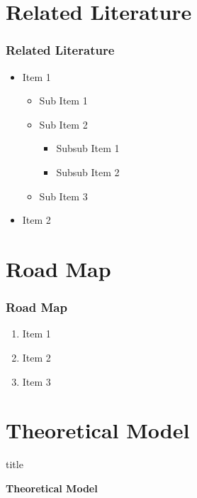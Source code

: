 \documentclass[11pt]{beamer}
\begin{document}
	\section[Literature]{Related Literature}
	\begin{frame}
		\frametitle{\bfseries Related Literature}
		
		\begin{itemize}
			\item Item 1
			
			\begin{itemize}
				\item Sub Item 1
				\item Sub Item 2
				
				\begin{itemize}
					\item Subsub Item 1
					\item Subsub Item 2
				\end{itemize}
				\item Sub Item 3
			\end{itemize}
			\item Item 2
			
		\end{itemize}
		
	\end{frame}
	
	\section{Road Map}
	\begin{frame}
		
		\frametitle{\bfseries Road Map}
		
		\begin{enumerate}
			\item Item 1
			\item Item 2
			\item Item 3
		\end{enumerate}
	\end{frame}
	
	\section[Theoretical]{Theoretical Model}
	\begin{frame}
		\begin{beamercolorbox}{title}
			\begin{center}
				\bfseries \huge Theoretical Model
			\end{center}
		\end{beamercolorbox}
		
	\end{frame}
	
\end{document}
